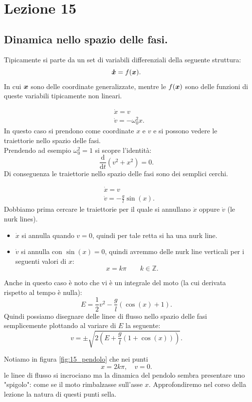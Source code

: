 \section{Lezione 15}%
\label{sub:Lezione 15}
\subsection{Dinamica nello spazio delle fasi.}%
\label{sub:Dinamica nello spazio delle fasi.}
Tipicamente si parte da un set di variabili differenziali della seguente struttura:
\[
    \boldsymbol{\dot{x}} = f(\boldsymbol{x}) 
.\] 
In cui $\boldsymbol{x}$  sono delle coordinate generalizzate, mentre le $f(\boldsymbol{x})$  sono delle funzioni di queste variabili tipicamente non lineari.
\begin{exmp}
    \[\begin{aligned}
	& \dot{x}=v\\
	& \dot{v} = -\omega_0^2x
    .\end{aligned}\]
    In questo caso si prendono come coordinate $x$  e $v$  e si possono vedere le traiettorie nello spazio delle fasi.\\
    Prendendo ad esempio $\omega_0^2 = 1$  si scopre l'identità:
    \[
	\frac{\text{d} }{\text{d} t} (v^2+x^2) = 0
    .\] 
    Di conseguenza le traiettorie nello spazio delle fasi sono dei semplici cerchi.
    
\end{exmp}
\noindent
\begin{exmp}[Pendolo]
    \[\begin{aligned}
	& \dot{x}=v\\
	& \dot{v}=-\frac{g}{l}\sin (x) 
    .\end{aligned}\]
    Dobbiamo prima cercare le traiettorie per il quale si annullano $\dot{x}$ oppure $\dot{v}$ (le nurk lines). 
    \begin{itemize}
        \item $\dot{x}$ si annulla quando $v = 0$, quindi per tale retta si ha una nurk line.
	\item $\dot{v}$ si annulla con $\sin (x) = 0$, quindi avremmo delle nurk line verticali per i seguenti valori di $x$: 
	    \[
		x = k\pi  \qquad k \in \mathbb{Z}
	    .\] 
    \end{itemize}
    Anche in questo caso è noto che vi è un integrale del moto (la cui derivata rispetto al tempo è nulla): 
    \[
	E = \frac{1}{2}v^2 - \frac{g}{l}\left(\cos (x) + 1\right)
    .\] 
    Quindi possiamo disegnare delle linee di flusso nello spazio delle fasi semplicemente plottando al variare di $E$  la seguente:
    \[
	v = \pm \sqrt{2 \left( E + \frac{g}{l}(1 + \cos (x)) \right) } 
    .\] 
    
    Notiamo in figura \ref{fig:15_pendolo} che nei punti 
    \[
        x = 2k\pi, \quad v = 0
    .\] 
    le linee di flusso si incrociano ma la dinamica del pendolo sembra presentare uno "spigolo": come se il moto rimbalzasse sull'asse $x$. Approfondiremo nel corso della lezione la natura di questi punti sella.
\end{exmp}
